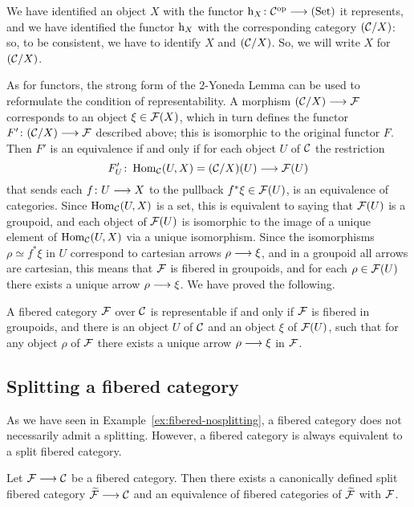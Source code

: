 \begin{3   FIBERED CATEGORIES}
\begin{3.6 Objects as fibcats and the 2-Yoneda}
We have identified an object $X$ with the functor $\h_X \colon \cC\op \arr \catset$ it represents, and we have identified the functor $\mathrm{h}_X$ with the corresponding category $(\mathcal{C}/X)$: so, to be consistent, we have to identify $X$ and $(\mathcal{C}/X)$. So, we will write $X$ for $(\mathcal{C}/X)$.

As for functors, the strong form of the 2-Yoneda Lemma can be used to reformulate the condition of representability. A morphism $(\cC/X) \arr \cF$ corresponds to an object $\xi\in \mathcal{F}(X)$, which in turn defines the functor $F'\colon (\cC/X) \arr \cF$ described above; this is isomorphic to the original functor $F$. Then $F'$ is an equivalence if and only if for each object $U$ of $\mathcal{C}$ the restriction
   \[
   F'_U \colon \hom_{\cC}(U, X) = (\cC/X)(U)
   \arr \cF(U)
   \]
that sends each $f \colon U \arr X$ to the pullback $f^* \xi \in \mathcal{F}(U)$, is an equivalence of categories. Since $\operatorname{Hom}_{\mathcal{C}}(U, X)$ is a set, this is equivalent to saying that $\mathcal{F}(U)$ is a groupoid, and each object of $\mathcal{F}(U)$ is isomorphic to the image of a unique element of $\operatorname{Hom}_{\mathcal{C}}(U,X)$ via a unique isomorphism. Since the isomorphisms $\rho \simeq f^* \xi$ in $U$ correspond to cartesian arrows $\rho \arr \xi$, and in a groupoid all arrows are cartesian, this means that $\mathcal{F}$ is fibered in groupoids, and for each $\rho\in \mathcal{F}(U)$ there exists a unique arrow $\rho \arr \xi$. We have proved the following.

\begin{proposition}
A fibered category $\mathcal{F}$ over $\mathcal{C}$ is representable if and only if $\mathcal{F}$ is fibered in groupoids, and there is an object $U$ of $\mathcal{C}$ and an object $\xi$ of $\mathcal{F}(U)$, such that for any object $\rho$ of $\mathcal{F}$ there exists a unique arrow $\rho \arr \xi$ in $\mathcal{F}$.
\end{proposition}


\subsection{Splitting a fibered category}

As we have seen in Example~\ref{ex:fibered-nosplitting}, a fibered category does not necessarily admit a splitting. However, a fibered category is always equivalent to a split fibered category.

\begin{theorem}\label{thm:equivalent-split}
Let $\cF \arr \cC$ be a fibered category. Then there exists a canonically defined split fibered category $\widetilde{\cF} \arr \cC$ and an equivalence of fibered categories of $\widetilde{\mathcal{F}}$ with $\mathcal{F}$.
\end{theorem}


\end{3.6 Objects as fibcats and the 2-Yoneda}
\end{3   FIBERED CATEGORIES}

